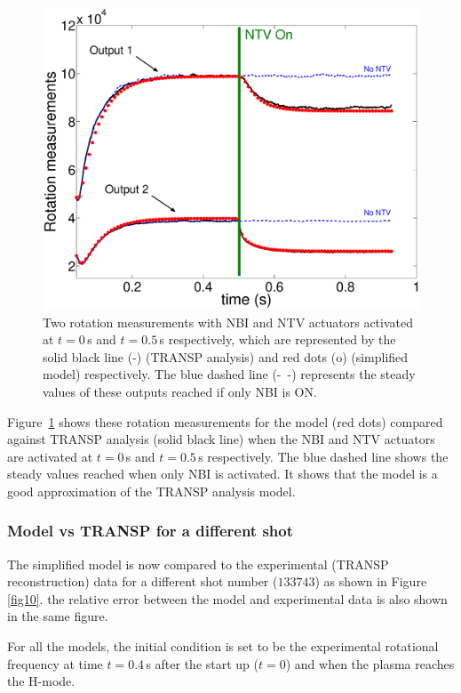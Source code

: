 \documentclass[12pt]{iopart}
\begin{document}
\begin{figure}
\centering
\includegraphics[width=\linewidth]{imene_figs/Goum12} 
\caption{Two rotation measurements with NBI and NTV actuators activated at $t=0$\,s and $t=0.5$\,s respectively, which are represented by the solid black line (-) (TRANSP analysis) and red dots (o) (simplified model) respectively. The blue dashed line (-~-) represents the steady values of these outputs reached if only NBI is ON.}
\label{Goum12}
\end{figure}

Figure~\ref{Goum12} shows these rotation measurements for the model (red dots) compared against TRANSP analysis (solid black line) when the NBI and NTV actuators are activated at $t=0$\,s and $t=0.5$\,s respectively. The blue dashed line shows the steady values reached when only NBI is activated. It shows that the model is a good approximation of the TRANSP analysis model.



\subsubsection{Model vs TRANSP for a different shot}

The simplified model is now compared to the experimental (TRANSP reconstruction) data for a different shot number ($133743$) as shown in Figure \ref{fig10}. the relative error between the model and experimental data is also shown in  the same figure.

For all the models, the initial condition is set to be the experimental rotational frequency at  time $t=0.4$\,s after the start up ($t=0$) and when the plasma reaches the H-mode.
\end{document}
